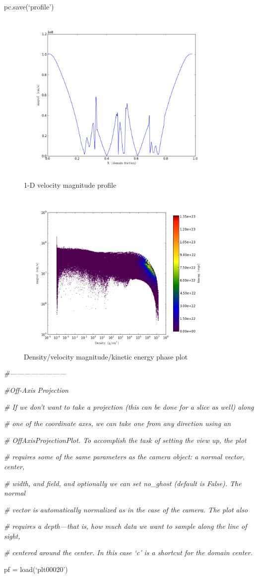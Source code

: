 pc.save(`profile')
\begin{figure}[h]
  \centering
  \includegraphics[width=4.0in]{Visualization/LineQueryPlot_0_t_magvel}
  \caption{1-D velocity magnitude profile}
  \includegraphics[width=4.0in]{Visualization/Profile2D_1_Density_magvel_kineng}
  \caption{Density/velocity magnitude/kinetic energy phase plot}
\end{figure}
\quad

{\it\#------------------------}

{\it\#Off-Axis Projection}
{\setlength{\parskip}{0pt}

{\it\# If we don't want to take a projection (this can be done for a slice as well) along}

{\it\# one of the coordinate axes, we can take one from any direction using an}

{\it\# OffAxisProjectionPlot. To accomplish the task of setting the view up, the plot}

{\it\# requires some of the same parameters as the camera object: a normal vector, center,}

{\it\# width, and field, and optionally we can set no\_ghost (default is False). The normal}

{\it\# vector is automatically normalized as in the case of the camera. The plot also}

{\it\# requires a depth---that is, how much data we want to sample along the line of sight,}

{\it\# centered around the center. In this case `c' is a shortcut for the domain center.}

pf = load(`plt00020')
}

